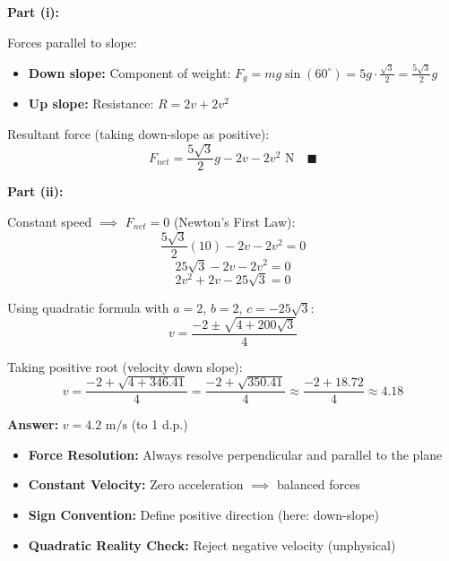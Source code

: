 \begin{solution}
\textbf{Part (i):}

Forces parallel to slope:
\begin{itemize}
\item \textbf{Down slope:} Component of weight: $F_g = mg\sin(60^\circ) = 5g \cdot \frac{\sqrt{3}}{2} = \frac{5\sqrt{3}}{2}g$
\item \textbf{Up slope:} Resistance: $R = 2v + 2v^2$
\end{itemize}

Resultant force (taking down-slope as positive):
\[
\boxed{F_{net} = \frac{5\sqrt{3}}{2}g - 2v - 2v^2 \text{ N}} \quad \blacksquare
\]

\textbf{Part (ii):}

Constant speed $\implies$ $F_{net} = 0$ (Newton's First Law):
\[
\frac{5\sqrt{3}}{2}(10) - 2v - 2v^2 = 0
\]
\[
25\sqrt{3} - 2v - 2v^2 = 0
\]
\[
2v^2 + 2v - 25\sqrt{3} = 0
\]

Using quadratic formula with $a=2$, $b=2$, $c=-25\sqrt{3}$:
\[
v = \frac{-2 \pm \sqrt{4 + 200\sqrt{3}}}{4}
\]

Taking positive root (velocity down slope):
\[
v = \frac{-2 + \sqrt{4 + 346.41}}{4} = \frac{-2 + \sqrt{350.41}}{4} \approx \frac{-2 + 18.72}{4} \approx 4.18
\]

\textbf{Answer:} $\boxed{v = 4.2 \text{ m/s}}$ (to 1 d.p.)
\end{solution}

\begin{takeaways}
\begin{itemize}
\item \textbf{Force Resolution:} Always resolve perpendicular and parallel to the plane
\item \textbf{Constant Velocity:} Zero acceleration $\implies$ balanced forces
\item \textbf{Sign Convention:} Define positive direction (here: down-slope)
\item \textbf{Quadratic Reality Check:} Reject negative velocity (unphysical)
\end{itemize}
\end{takeaways}

\vspace{1.5cm}


